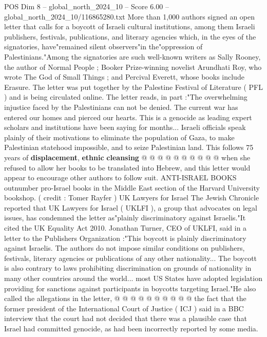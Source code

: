 \begin{textsample}{POS Dim 8 – global\_north\_2024\_10 – Score 6.00 – global\_north\_2024\_10/116865280.txt}  \label{ex:f8_pos_241}
More than 1,000 authors signed an open letter that calls for a boycott of Israeli cultural institutions, among them Israeli publishers, festivals, publications, and literary agencies which, in the eyes of the signatories, have"remained silent observers"in the"oppression of Palestinians."Among the signatories are such well-known writers as Sally Rooney, the author of Normal People ; Booker Prize-winning novelist Arundhati Roy, who wrote The God of Small Things ; and Percival Everett, whose books include Erasure.
The letter was put together by the Palestine Festival of Literature ( PFL ) and is being circulated online.
The letter reads, in part :"The overwhelming injustice faced by the Palestinians can not be denied.
The current war has entered our homes and pierced our hearts.
This is a genocide as leading expert scholars and institutions have been saying for months...
Israeli officials speak plainly of their motivations to eliminate the population of Gaza, to make Palestinian statehood impossible, and to seize Palestinian land.
This follows 75 years of \textbf{displacement}, \textbf{ethnic} \textbf{cleansing} @ @ @ @ @ @ @ @ @ @ when she refused to allow her books to be translated into Hebrew, and this letter would appear to encourage other authors to follow suit.
ANTI-ISRAEL BOOKS outnumber pro-Israel books in the Middle East section of the Harvard University bookshop. ( credit : Tomer Rayfer ) UK Lawyers for Israel The Jewish Chronicle reported that UK Lawyers for Israel ( UKLFI ), a group that advocates on legal issues, has condemned the letter as"plainly discriminatory against Israelis."It cited the UK Equality Act 2010.
Jonathan Turner, CEO of UKLFI, said in a letter to the Publishers Organization :"This boycott is plainly discriminatory against Israelis.
The authors do not impose similar conditions on publishers, festivals, literary agencies or publications of any other nationality...
The boycott is also contrary to laws prohibiting discrimination on grounds of nationality in many other countries around the world... most US States have adopted legislation providing for sanctions against participants in boycotts targeting Israel."He also called the allegations in the letter, @ @ @ @ @ @ @ @ @ @ the fact that the former president of the International Court of Justice ( ICJ ) said in a BBC interview that the court had not decided that there was a plausible case that Israel had committed genocide, as had been incorrectly reported by some media.

\end{textsample}
